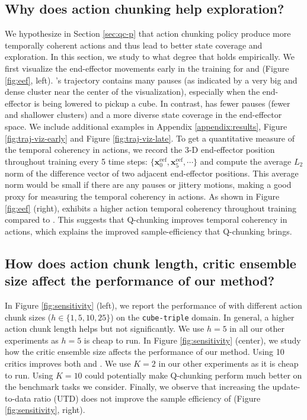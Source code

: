 \subsection{Why does action chunking help exploration?}
We hypothesize in Section \ref{sec:qc-p} that action chunking policy produce more temporally coherent actions and thus lead to better state coverage and exploration. In this section, we study to what degree that holds empirically. We first visualize the end-effector movements early in the training for  and  (Figure \ref{fig:eef}, left). 's trajectory contains many pauses (as indicated by a very big and dense cluster near the center of the visualization), especially when the end-effector is being lowered to pickup a cube. In contrast,  has fewer pauses (fewer and shallower clusters) and a more diverse state coverage in the end-effector space. We include additional examples in Appendix \ref{appendix:results}, Figure \ref{fig:traj-viz-early} and Figure \ref{fig:traj-viz-late}. To get a quantitative measure of the temporal coherency in actions, we record the 3-D end-effector position throughout training every 5 time steps: $\{\mathbf{x}^{\mathrm{eef}}_0, \mathbf{x}^{\mathrm{eef}}_5, \cdots\}$ and compute the average $L_2$ norm of the difference vector of two adjacent end-effector positions. This average norm would be small if there are any pauses or jittery motions, making a good proxy for measuring the temporal coherency in actions. 
As shown in Figure \ref{fig:eef} (right),  exhibits a higher action temporal coherency throughout training compared to . This suggests that Q-chunking improves temporal coherency in actions, which explains the improved sample-efficiency that Q-chunking brings. 

\subsection{How does action chunk length, critic ensemble size affect the performance of our method?}
In Figure \ref{fig:sensitivity} (left), we report the performance of  with different action chunk sizes ($h \in \{1, 5, 10, 25\}$) on the \texttt{cube-triple} domain. In general, a higher action chunk length helps but not significantly. We use $h=5$ in all our other experiments as $h=5$ is cheap to run. In Figure \ref{fig:sensitivity} (center), we study how the critic ensemble size affects the performance of our method. Using 10 critics improves both  and . We use $K=2$ in our other experiments as it is cheap to run. Using $K=10$ could potentially make Q-chunking perform much better on the benchmark tasks we consider. Finally, we observe that increasing the update-to-data ratio (UTD) does not improve the sample efficiency of  (Figure \ref{fig:sensitivity}, right). 


